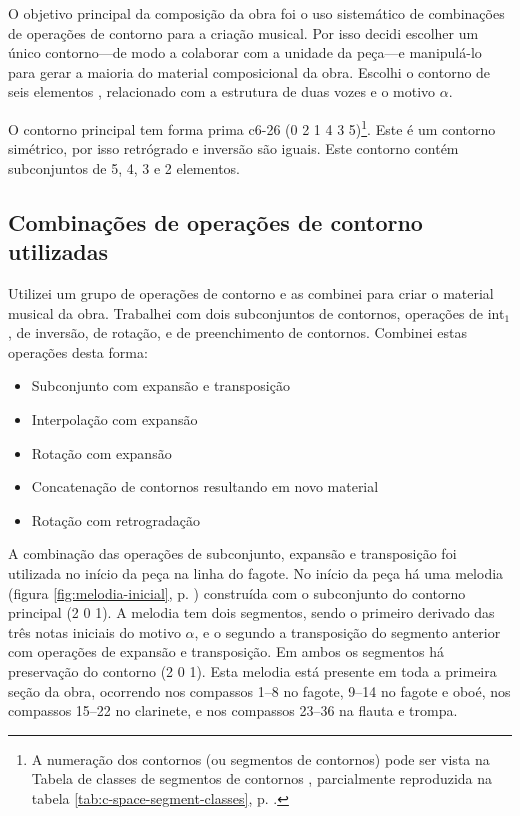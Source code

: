 O objetivo principal da composição da obra \obra{} foi o uso
sistemático de combinações de operações de contorno para a criação
musical. Por isso decidi escolher um único contorno---de modo a
colaborar com a unidade da peça---e manipulá-lo para gerar a maioria
do material composicional da obra. Escolhi o contorno de seis
elementos \contpr{}, relacionado com a estrutura de duas vozes e o
motivo $\alpha$.

O contorno principal \contpr{} tem forma prima c6-26 (0 2 1 4 3
5)\footnote{A numeração dos contornos (ou segmentos de contornos) pode
  ser vista na Tabela de classes de segmentos de contornos
  \cite{marvin.ea87:relating}, parcialmente reproduzida na tabela
  \ref{tab:c-space-segment-classes},
  p. \pageref{tab:c-space-segment-classes}.}. Este é um contorno
simétrico, por isso retrógrado e inversão são iguais. Este contorno
contém subconjuntos de 5, 4, 3 e 2 elementos.

\subsection{Combinações de operações de contorno utilizadas}
\label{sec:comb-de-oper}

Utilizei um grupo de operações de contorno e as combinei para criar o
material musical da obra. Trabalhei com dois subconjuntos de
contornos, operações de int$_1$, de inversão, de rotação, e de
preenchimento de contornos. Combinei estas operações desta forma:

\begin{itemize}
\item Subconjunto com expansão e transposição
\item Interpolação com expansão
\item Rotação com expansão
\item Concatenação de contornos resultando em novo material
\item Rotação com retrogradação
\end{itemize}

A combinação das operações de subconjunto, expansão e transposição foi
utilizada no início da peça na linha do fagote. No início da peça há
uma melodia (figura \ref{fig:melodia-inicial},
p. \pageref{fig:melodia-inicial}) construída com o subconjunto do
contorno principal (2 0 1). A melodia tem dois segmentos, sendo o
primeiro derivado das três notas iniciais do motivo $\alpha$, e o
segundo a transposição do segmento anterior com operações de expansão
e transposição. Em ambos os segmentos há preservação do contorno (2 0
1). Esta melodia está presente em toda a primeira seção da obra,
ocorrendo nos compassos 1--8 no fagote, 9--14 no fagote e oboé, nos
compassos 15--22 no clarinete, e nos compassos 23--36 na flauta e
trompa.

